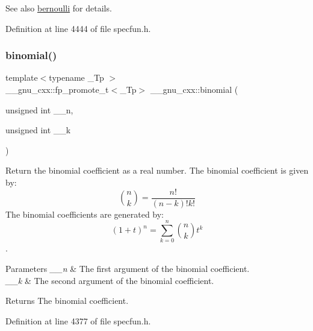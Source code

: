 \begin{DoxySeeAlso}{See also}
\hyperlink{group__mathsf__gnu_gad339f0011df1967ec6c9e55bd1547bf4}{bernoulli} for details. 
\end{DoxySeeAlso}


Definition at line 4444 of file specfun.\+h.

\mbox{\label{group__mathsf__gnu_gabd0cf6e3f1e1d36c4c45f118e34a5ca2}} 
\subsubsection{\texorpdfstring{binomial()}{binomial()}}
{\footnotesize\ttfamily template$<$typename \+\_\+\+Tp $>$ \\
\+\_\+\+\_\+gnu\+\_\+cxx\+::fp\+\_\+promote\+\_\+t$<$\+\_\+\+Tp$>$ \+\_\+\+\_\+gnu\+\_\+cxx\+::binomial (\begin{DoxyParamCaption}\item[{unsigned int}]{\+\_\+\+\_\+n,  }\item[{unsigned int}]{\+\_\+\+\_\+k }\end{DoxyParamCaption})\hspace{0.3cm}{\ttfamily [inline]}}



Return the binomial coefficient as a real number. The binomial coefficient is given by\+: \[ \binom{n}{k} = \frac{n!}{(n-k)! k!} \] The binomial coefficients are generated by\+: \[ \left(1 + t\right)^n = \sum_{k=0}^n \binom{n}{k} t^k \]. 


\begin{DoxyParams}{Parameters}
{\em \+\_\+\+\_\+n} & The first argument of the binomial coefficient. \\
\hline
{\em \+\_\+\+\_\+k} & The second argument of the binomial coefficient. \\
\hline
\end{DoxyParams}
\begin{DoxyReturn}{Returns}
The binomial coefficient. 
\end{DoxyReturn}


Definition at line 4377 of file specfun.\+h.

\mbox{\label{group__mathsf__gnu_ga54276b9f03ad7b10e991b1681e0d2dd3}} 
